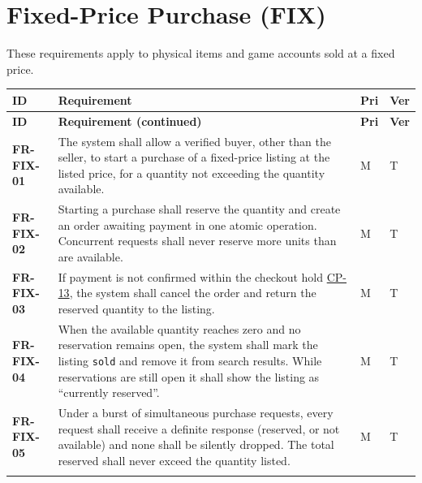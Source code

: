 \documentclass[11pt,a4paper]{report}
\makeatletter
\newenvironment{reqs}{%
  \small
  \begin{longtable}{@{}>{\raggedright\arraybackslash}p{2.35cm}
                       >{\raggedright\arraybackslash}p{10.3cm}
                       >{\centering\arraybackslash}p{0.7cm}
                       >{\centering\arraybackslash}p{0.7cm}@{}}
  \toprule
  \textbf{ID} & \textbf{Requirement} & \textbf{Pri} & \textbf{Ver} \\
  \midrule
  \endfirsthead
  \toprule
  \textbf{ID} & \textbf{Requirement (continued)} & \textbf{Pri} & \textbf{Ver} \\
  \midrule
  \endhead
  \bottomrule
  \endfoot
}{\end{longtable}}
\newcommand{\req}[5]{\leavevmode\textbf{#1}\hypertarget{#1}{} & #5 & #2 & #3 \\ \addlinespace[2pt]}
\newcommand{\cp}[1]{\hyperlink{#1}{#1}}
\makeatother
\begin{document}
\section{Fixed-Price Purchase (FIX)}
These requirements apply to physical items and game accounts sold at a fixed price.
\begin{reqs}
\req{FR-FIX-01}{M}{T}{FR-35}{The system shall allow a verified buyer, other than the seller, to start a purchase of a fixed-price listing at the listed price, for a quantity not exceeding the quantity available.}
\req{FR-FIX-02}{M}{T}{FR-36}{Starting a purchase shall reserve the quantity and create an order awaiting payment in one atomic operation. Concurrent requests shall never reserve more units than are available.}
\req{FR-FIX-03}{M}{T}{new}{If payment is not confirmed within the checkout hold \cp{CP-13}, the system shall cancel the order and return the reserved quantity to the listing.}
\req{FR-FIX-04}{M}{T}{FR-37}{When the available quantity reaches zero and no reservation remains open, the system shall mark the listing \texttt{sold} and remove it from search results. While reservations are still open it shall show the listing as ``currently reserved''.}
\req{FR-FIX-05}{M}{T}{FR-38}{Under a burst of simultaneous purchase requests, every request shall receive a definite response (reserved, or not available) and none shall be silently dropped. The total reserved shall never exceed the quantity listed.}
\end{reqs}
\end{document}
